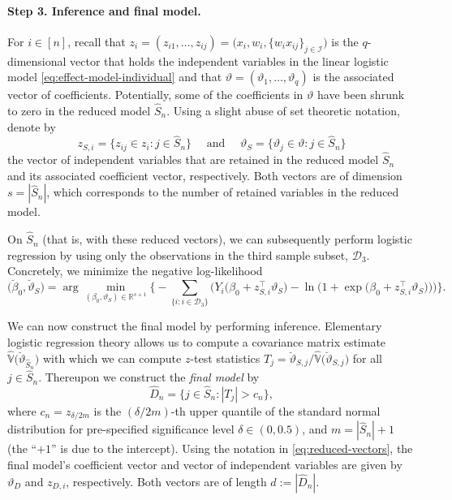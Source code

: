 \documentclass[11pt]{article}
\newcommand{\R}{\mathbb{R}}
\newcommand{\V}{\mathbb{V}}
\newcommand{\D}{\mathcal{D}}
\begin{document}
\paragraph{Step 3. Inference and final model.} For $i\in [n]$, recall that $z_i = (z_{i1},\dots, z_{ij}) = \big(x_i, w_i, \{ w_i x_{ij} \}_{j\in\mathcal{I}}\big)$ is the $q$-dimensional vector that holds the independent variables in the linear logistic model \eqref{eq:effect-model-individual} and that $\vartheta = (\vartheta_1, \dots, \vartheta_q)$ is the associated vector of coefficients. Potentially, some of the coefficients in $\vartheta$ have been shrunk to zero in the reduced model $\widehat{S}_n$. Using a slight abuse of set theoretic notation, denote by
\begin{equation}\label{eq:reduced-vectors}
    z_{S,i}
    =
    \Big\{
        z_{ij} \in z_i : j \in \widehat{S}_n
    \Big\}
    \quad \text{ and } \quad
    \vartheta_{S} 
    = 
    \Big\{
        \vartheta_j \in \vartheta : j \in \widehat{S}_n
    \Big\}
\end{equation}
the vector of independent variables that are retained in the reduced  model $\widehat{S}_n$ and its associated coefficient vector, respectively. Both vectors are of dimension $s = |\widehat{S}_n|$, which corresponds to the number of retained variables in the reduced model.

On $\widehat{S}_n$ (that is, with these reduced vectors), we can subsequently perform logistic regression by using only the observations in the third sample subset, $\D_3$. Concretely, we minimize the negative log-likelihood 
\begin{equation*} 
    \big(\breve{\beta}_0, \breve{\vartheta}_S\big)
    =
    \arg\min_{(\beta_0, \vartheta_S) \in \R^{s+1}}
    \Bigg\{
    - 
    \sum_{\{ i:i \in \D_3 \}} \bigg( Y_i \big(\beta_0 + z_{S,i}^\top \vartheta_S \big) - \ln\Big( 1 + \exp \big(\beta_0 + z_{S,i}^\top \vartheta_S\big) \Big)\bigg)\Bigg\}.
\end{equation*}

We can now construct the final model by performing inference. Elementary logistic regression theory allows us to compute a covariance matrix estimate $\widehat{\V}\big(\breve{\vartheta}_{\widehat{S}_n}\big)$ with which we can compute $z$-test statistics $T_j = \breve{\vartheta}_{S, j} \Big/ \widehat{\V}\big(\breve{\vartheta}_{S,j}\big)$ for all $j \in \widehat{S}_n$. Thereupon we construct the \textit{final model} by
\[
    \widehat{D}_n = \Big\{ j\in\widehat{S}_n : |T_j| > c_n \Big\},
\]
where $c_n = z_{\delta/2m}$ is the $(\delta/2m)$-th upper quantile of the standard normal distribution for pre-specified significance level $\delta\in(0,0.5)$, and $m = |\widehat{S}_n| + 1$ (the ``$+1$'' is due to the intercept). Using the notation in \eqref{eq:reduced-vectors}, the final model's  coefficient vector and vector of independent variables are given by  $\vartheta_D$ and $z_{D,i}$, respectively. Both vectors are of length $d := |\widehat{D}_n|$.
\end{document}
